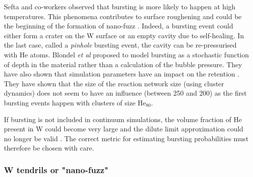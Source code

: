 Sefta and co-workers observed that bursting is more likely to happen at high temperatures.
This phenomena contributes to surface roughening and could be the beginning of the formation of nano-fuzz .
Indeed, a bursting event could either form a crater on the W surface or an empty cavity due to self-healing.
In the last case, called a \textit{pinhole} bursting event, the cavity can be re-pressurised with He atoms.
Blondel \textit{et al} proposed to model bursting as a stochastic function of depth in the material rather than a calculation of the bubble pressure.
They have also shown that simulation parameters have an impact on the retention .
They have shown that the size of the reaction network size (using cluster dynamics) does not seem to have an influence (between 250 and 200) as the first bursting events happen with clusters of size $\text{He}_{80}$.

If bursting is not included in continuum simulations, the volume fraction of He present in W could become very large and the dilute limit approximation could no longer be valid .
The correct metric for estimating bursting probabilities must therefore be chosen with care.

\subsubsection{W tendrils or "nano-fuzz"}

